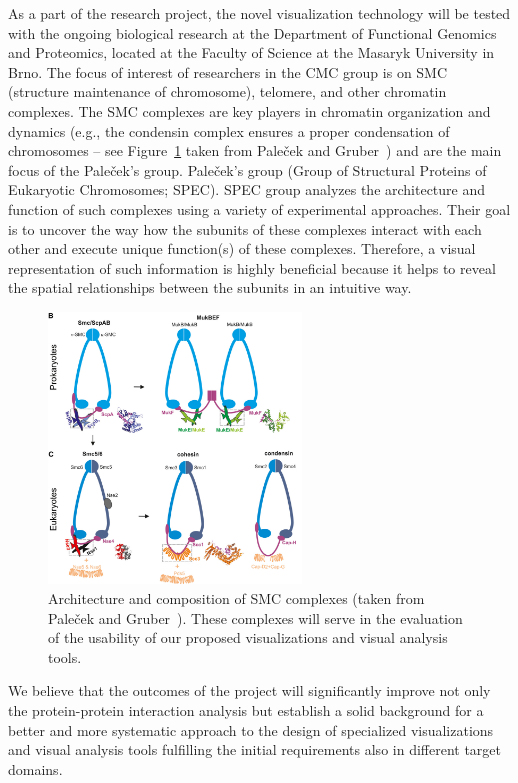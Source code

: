 \documentclass[11pt,a4paper,titlepage,oneside,onecolumn]{article}
\begin{document}
As a part of the research project, the novel visualization technology will be tested with the ongoing biological research at the Department of Functional Genomics and Proteomics, located at the Faculty of Science at the Masaryk University in Brno. 
The focus of interest of researchers in the CMC group is on SMC (structure maintenance of chromosome), telomere, and other chromatin complexes. 
The SMC complexes are key players in chromatin organization and dynamics (e.g., the condensin complex ensures a proper condensation of chromosomes -- see Figure~\ref{fig:telomere} taken from Pale\v{c}ek and Gruber~\cite{Palecek2015}) and are the main focus of the Pale\v{c}ek's group.
Pale\v{c}ek's group (Group of Structural Proteins of Eukaryotic Chromosomes; SPEC). SPEC group analyzes the architecture and function of such complexes using a variety of experimental approaches. 
Their goal is to uncover the way how the subunits of these complexes interact with each other and execute unique function(s) of these complexes. 
Therefore, a visual representation of such information is highly beneficial because it helps to reveal the spatial relationships between the subunits in an intuitive way.

\begin{figure}[h]
  \centering
  \includegraphics[width=0.6\textwidth]{pics/telomer.png}
  \caption{Architecture and composition of SMC complexes (taken from Pale\v{c}ek and Gruber~\cite{Palecek2015}). These complexes will serve in the evaluation of the usability of our proposed visualizations and visual analysis tools.}
  \label{fig:telomere}
\end{figure}

We believe that the outcomes of the project will significantly improve not only the protein-protein interaction analysis but establish a solid background for a better and more systematic approach to the design of specialized visualizations and visual analysis tools fulfilling the initial requirements also in different target domains.
\end{document}

